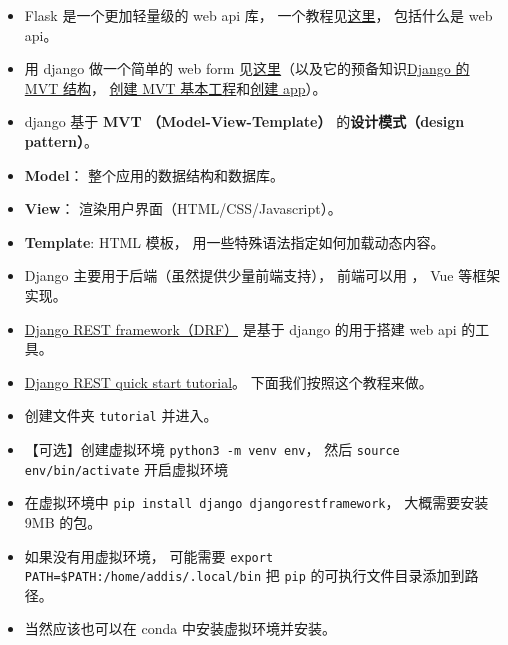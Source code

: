 

\begin{issues}
\issueDraft
\end{issues}

\begin{itemize}
\item Flask 是一个更加轻量级的 web api 库， 一个教程见\href{https://programminghistorian.org/en/lessons/creating-apis-with-python-and-flask}{这里}， 包括什么是 web api。
\item 用 django 做一个简单的 web form 见\href{https://www.geeksforgeeks.org/how-to-create-a-form-using-django-forms/}{这里}（以及它的预备知识\href{https://www.geeksforgeeks.org/django-project-mvt-structure}{Django 的 MVT 结构}， \href{https://www.geeksforgeeks.org/how-to-create-a-basic-project-using-mvt-in-django/}{创建 MVT 基本工程}和\href{https://www.geeksforgeeks.org/how-to-create-an-app-in-django/}{创建 app}）。
\item django 基于 \textbf{MVT （Model-View-Template）} 的\textbf{设计模式（design pattern）}。
\item \textbf{Model}： 整个应用的数据结构和数据库。
\item \textbf{View}： 渲染用户界面（HTML/CSS/Javascript）。
\item \textbf{Template}: HTML 模板， 用一些特殊语法指定如何加载动态内容。
\item Django 主要用于后端（虽然提供少量前端支持）， 前端可以用 ， Vue 等框架实现。
\item \href{https://www.django-rest-framework.org/}{Django REST framework（DRF）} 是基于 django 的用于搭建 web api 的工具。
\item \href{https://www.django-rest-framework.org/tutorial/quickstart/}{Django REST quick start tutorial}。 下面我们按照这个教程来做。
\item 创建文件夹 \verb|tutorial| 并进入。
\item 【可选】创建虚拟环境 \verb|python3 -m venv env|， 然后 \verb|source env/bin/activate| 开启虚拟环境
\item 在虚拟环境中 \verb|pip install django djangorestframework|， 大概需要安装 9MB 的包。
\item 如果没有用虚拟环境， 可能需要 \verb|export PATH=$PATH:/home/addis/.local/bin| 把 \verb|pip| 的可执行文件目录添加到路径。
\item 当然应该也可以在 conda 中安装虚拟环境并安装。

\end{itemize}
